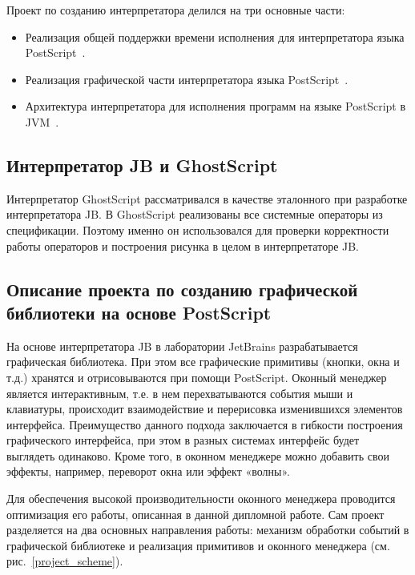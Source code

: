 	Проект по созданию интерпретатора делился на три основные части:
	\begin{itemize}
		\item Реализация общей поддержки времени исполнения для интерпретатора языка PostScript~\cite{runtime}.
		\item Реализация графической части интерпретатора языка PostScript~\cite{graphic}.
		\item Архитектура интерпретатора для исполнения программ на языке PostScript в JVM~\cite{architecture}.
	\end{itemize}

		
	 
	\subsection{Интерпретатор JB и GhostScript}
	Интерпретатор GhostScript рассматривался в качестве эталонного при разработке интерпретатора JB. В GhostScript реализованы все системные операторы из спецификации. Поэтому именно он использовался для проверки корректности работы операторов и построения рисунка в целом в интерпретаторе JB.
		
	
	\subsection{Описание проекта по созданию графической \\ библиотеки на основе PostScript}	
	На основе интерпретатора JB  в лаборатории JetBrains разрабатывается графическая библиотека. При этом все графические примитивы (кнопки, окна и т.д.) хранятся и отрисовываются при помощи PostScript. Оконный менеджер является интерактивным, т.е. в нем перехватываются события мыши и клавиатуры, происходит взаимодействие и перерисовка изменившихся элементов интерфейса.  Преимущество данного подхода заключается в гибкости построения графического интерфейса, при этом в разных системах интерфейс будет выглядеть одинаково. Кроме того, в оконном менеджере можно добавить свои эффекты, например, переворот окна или эффект «волны».
	
	Для обеспечения высокой производительности оконного менеджера проводится оптимизация его работы, описанная в данной дипломной работе. Сам проект разделяется на два основных направления работы: механизм обработки событий в графической библиотеке и реализация примитивов и оконного менеджера (см. рис.~\ref{project_scheme}). 
	
